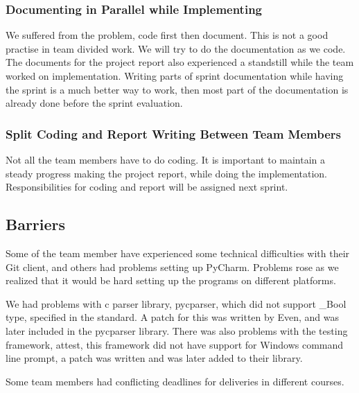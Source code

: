 \subsubsection{Documenting in Parallel while Implementing}
We suffered from the problem, code first then document. This is not a good
practise in team divided work. We will try to do the documentation as we code.
The documents for the project report also experienced a standstill while the
team worked on implementation. Writing parts of sprint documentation while
having the sprint is a much better way to work, then most part of the
documentation is already done before the sprint evaluation.

\subsubsection{Split Coding and Report Writing Between Team Members} 
Not all the team members have to do coding. It is important to maintain a
steady progress making the project report, while doing the implementation. 
Responsibilities for coding and report will be assigned next sprint. 

\subsection{Barriers}
Some of the team member have experienced some technical difficulties with their
Git client, and others had problems setting up PyCharm. Problems rose as we
realized that it would be hard setting up the programs on different
platforms.

We had problems with \Gls{c} \gls{parser} \gls{library}, \gls{pycparser}, which did not support \_Bool
type, specified in the  standard. A patch for this was written by Even, and
was later included in the \gls{pycparser} \gls{library}. There was also problems with the
testing framework, attest, this framework did not have support for Windows
command line prompt, a patch was written and was later added to their \gls{library}.

Some team members had conflicting deadlines for deliveries in different courses.

